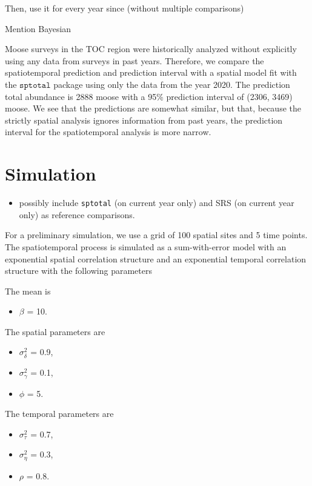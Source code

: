 \documentclass[]{interact}
\theoremstyle{plain}%
\theoremstyle{definition}
\theoremstyle{remark}
\def\tightlist{}
\begin{document}
Then, use it for every year since (without multiple comparisons)

Mention Bayesian

Moose surveys in the TOC region were historically analyzed without
explicitly using any data from surveys in past years. Therefore, we
compare the spatiotemporal prediction and prediction interval with a
spatial model fit with the \(\texttt{sptotal}\) package using only the
data from the year 2020. The prediction total abundance is 2888 moose
with a 95\% prediction interval of (2306, 3469) moose. We see that the
predictions are somewhat similar, but that, because the strictly spatial
analysis ignores information from past years, the prediction interval
for the spatiotemporal analysis is more narrow.

\section{Simulation} \label{section:Simulation}

\begin{itemize}
\tightlist
\item
  possibly include \texttt{sptotal} (on current year only) and SRS (on
  current year only) as reference comparisons.
\end{itemize}

For a preliminary simulation, we use a grid of 100 spatial sites and 5
time points. The spatiotemporal process is simulated as a sum-with-error
model with an exponential spatial correlation structure and an
exponential temporal correlation structure with the following parameters

The mean is

\begin{itemize}
\tightlist
\item
  \(\beta\) = 10.
\end{itemize}

The spatial parameters are

\begin{itemize}
\tightlist
\item
  \(\sigma^2_{\delta}\) = 0.9,
\item
  \(\sigma^2_{\gamma}\) = 0.1,
\item
  \(\phi\) = 5.
\end{itemize}

The temporal parameters are

\begin{itemize}
\tightlist
\item
  \(\sigma^2_{\tau}\) = 0.7,
\item
  \(\sigma^2_{\eta}\) = 0.3,
\item
  \(\rho\) = 0.8.
\end{itemize}
\end{document}

